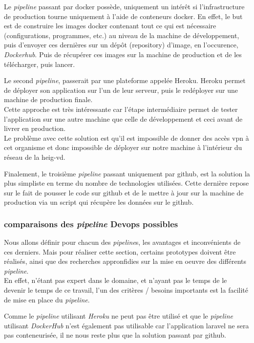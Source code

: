 \documentclass[
    iai, %
    il, %
]{heig-tb}
\begin{document}
Le \emph{pipeline} passant par \Gls{docker} possède, uniquement un intérêt si l'infrastructure de production tourne uniquement à l'aide de \Gls{conteneur}s \Gls{docker}. En effet, le but est de construire les images \Gls{docker} contenant tout ce qui est nécessaire (configurations, programmes, etc.) au niveau de la machine de développement, puis d'envoyer ces dernières sur un dépôt (\Gls{repository}) d'image, en l'occurence, \emph{Dockerhub}. Puis de
récupérer ces images sur la machine de production et de les télécharger, puis lancer.

Le second \emph{pipeline}, passerait par une plateforme appelée Heroku. Heroku permet de déployer son application sur l'un de leur serveur, puis le redéployer sur une machine de production finale.\\
Cette approche est très intéressante car l'étape intermédiaire permet de tester l'application sur une autre machine que celle de développement et ceci avant de livrer en production.\\
Le problème avec cette solution est qu'il est impossible de donner des accès \Gls{vpn} à cet organisme et donc impossible de déployer sur notre machine à l'intérieur du réseau de la \Gls{heig-vd}.

Finalement, le troisième \emph{pipeline} passant uniquement par \Gls{github}, est la solution la plus simpliste en terme du nombre de technologies utilisées. Cette dernière repose sur le fait de pousser le code sur \Gls{github} et de le mettre à jour sur la machine de production via un script qui récupère les données sur le \Gls{github}.

\subsubsection{comparaisons des \emph{pipeline} Devops possibles}
Nous allons définir pour chacun des \emph{pipeline}s, les avantages et inconvénients de ces derniers.
Mais pour réaliser cette section, certains prototypes doivent être réalisés, ainsi que des recherches appronfidies sur la mise en oeuvre des différents \emph{pipeline}.\\
En effet, n'étant pas expert dans le domaine, et n'ayant pas le temps de le devenir le temps de ce travail, l'un des critères / besoins importants est la facilité de mise en place du \emph{pipeline}.

Comme le \emph{pipeline} utilisant \emph{Heroku} ne peut pas être utilisé et que le \emph{pipeline} utilisant \emph{DockerHub} n'est également pas utilisable car l'application \Gls{laravel} ne sera pas conteneurisée, il ne nous reste plus que la solution passant par \Gls{github}.
\end{document}
